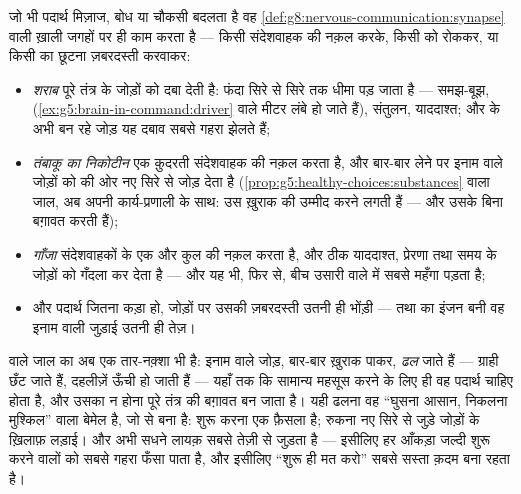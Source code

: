 \begin{proposition}\label{prop:g8:protecting-the-nervous-system:substances}
जो भी पदार्थ मिज़ाज, बोध या चौकसी बदलता है वह
\cref{def:g8:nervous-communication:synapse} वाली ख़ाली जगहों पर ही काम
करता है --- किसी संदेशवाहक की नक़ल करके, किसी को रोककर, या किसी का छूटना
ज़बरदस्ती करवाकर:
\begin{itemize}
  \item \emph{शराब} पूरे तंत्र के जोड़ों को दबा देती है: फंदा सिरे से
        सिरे तक धीमा पड़ जाता है --- समझ-बूझ, 
        (\cref{ex:g5:brain-in-command:driver} वाले मीटर लंबे हो जाते
        हैं), संतुलन, याददाश्त; और   के अभी बन रहे जोड़ यह
        दबाव सबसे गहरा झेलते हैं;
  \item \emph{तंबाकू का निकोटीन} एक क़ुदरती संदेशवाहक की नक़ल करता है,
        और बार-बार लेने पर इनाम वाले जोड़ों को \emph{} की ओर नए सिरे
        से जोड़ देता है (\cref{prop:g5:healthy-choices:substances} वाला
        जाल, अब अपनी कार्य-प्रणाली के साथ:  उस ख़ुराक
        की उम्मीद करने लगती हैं --- और उसके बिना बग़ावत करती हैं);
  \item \emph{गाँजा} संदेशवाहकों के एक और कुल की नक़ल करता है, और ठीक
        याददाश्त, प्रेरणा तथा समय के जोड़ों को गँदला कर देता है ---
        और यह भी, फिर से, बीच उसारी वाले  में सबसे महँगा पड़ता
        है;
  \item और पदार्थ जितना कड़ा हो, जोड़ों पर उसकी ज़बरदस्ती उतनी ही
        भोंड़ी --- तथा  का इंजन बनी वह इनाम वाली जुड़ाई उतनी ही
        तेज़।
\end{itemize}
\end{proposition}
\admitted

\begin{remark}[लत, कार्य-प्रणाली के हिसाब से]\label{rem:g8:protecting-the-nervous-system:addiction}
 वाले जाल का अब एक तार-नक़्शा भी है:
इनाम वाले जोड़, बार-बार ख़ुराक पाकर, \emph{ढल} जाते हैं --- ग्राही छँट
जाते हैं, दहलीज़ें ऊँची हो जाती हैं --- यहाँ तक कि सामान्य महसूस करने के
लिए ही वह पदार्थ चाहिए होता है, और उसका न होना पूरे तंत्र की बग़ावत बन
जाता है। यही ढलना वह ``घुसना आसान, निकलना मुश्किल'' वाला बेमेल है, जो
 से बना है: शुरू करना एक फ़ैसला है; रुकना नए सिरे से जुड़े
जोड़ों के ख़िलाफ़ लड़ाई। और अभी सधने लायक़   सबसे तेज़ी से
जुड़ता है --- इसीलिए हर आँकड़ा जल्दी शुरू करने वालों को सबसे गहरा फँसा
पाता है, और इसीलिए ``शुरू ही मत करो'' सबसे सस्ता क़दम बना रहता है।
\end{remark}

